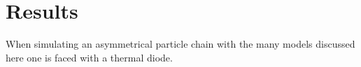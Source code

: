 
\chapter{Results}

When simulating an asymmetrical particle chain with the many models discussed here one is faced with a thermal diode.